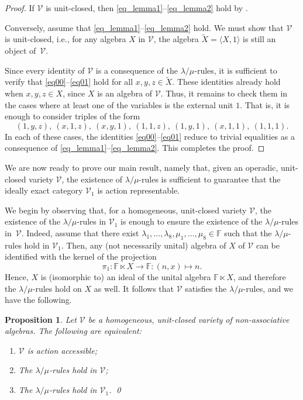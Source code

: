 \documentclass[reqno,a4paper]{amsart}
\theoremstyle{plain}
\newtheorem{proposition}[subsection]{Proposition}
\theoremstyle{definition}
\theoremstyle{remark}
\numberwithin{equation}{section}
\newenvironment{tfae}
{\renewcommand{\labelenumi}{(\roman{enumi})}
\begin{enumerate}}
{\end{enumerate}}
\newcommand{\noproof}{\hfil\qed}
\newcommand{\F}{\mathbb{F}}
\newcommand{\V}{\mathcal{V}}
\begin{document}
\begin{proof}
If $\V$ is unit-closed, then \eqref{eq_lemma1}--\eqref{eq_lemma2} hold by .

Conversely, assume that \eqref{eq_lemma1}--\eqref{eq_lemma2} hold. We must show that $\V$ is unit-closed, i.e., for any algebra $X$ in $\V$, the algebra $\widetilde X=\langle X,1 \rangle$ is still an object of~$\V$.

Since every identity of $\V$ is a consequence of the $\lambda/\mu$-rules, it is sufficient to verify that \eqref{eq00}--\eqref{eq01} hold for all $x,y,z \in \widetilde X$. These identities already hold when $x,y,z \in X$, since $X$ is an algebra of $\V$. Thus, it remains to check them in the cases where at least one of the variables is the external unit $1$. That is, it is enough to consider triples of the form
\[
(1,y,z),\ (x,1,z),\ (x,y,1),\ (1,1,z),\ (1,y,1),\ (x,1,1),\ (1,1,1).
\]
In each of these cases, the identities \eqref{eq00}--\eqref{eq01} reduce to trivial equalities as a consequence of \eqref{eq_lemma1}--\eqref{eq_lemma2}. This completes the proof.
\end{proof}

We are now ready to prove our main result, namely that, given an operadic, unit-closed variety $\V$, the existence of $\lambda/\mu$-rules is sufficient to guarantee that the ideally exact category $\V_1$ is action representable. 

We begin by observing that, for a homogeneous, unit-closed variety $\V$, the existence of the $\lambda/\mu$-rules in $\V_1$ is enough to ensure the existence of the $\lambda/\mu$-rules in~$\V$. Indeed, assume that there exist $\lambda_1,\ldots,\lambda_8,\mu_1,\ldots,\mu_8 \in \F$ such that the $\lambda/\mu$-rules hold in $\V_1$. Then, any (not necessarily unital) algebra of $X$ of $\V$ can be identified with the kernel of the projection
\[
\pi_1 \colon \F \ltimes X \to \F \colon (n,x) \mapsto n.
\]
Hence, $X$ is (isomorphic to) an ideal of the unital algebra $\F \ltimes X$, and therefore the $\lambda/\mu$-rules hold on $X$ as well. It follows that $\V$ satisfies the $\lambda/\mu$-rules, and we have the following.

\begin{proposition}
Let $\V$ be a homogeneous, unit-closed variety of non-associative algebras. The following are equivalent:
\begin{tfae}
\item $\V$ is action accessible;
\item The $\lambda/\mu$-rules hold in $\V$;
\item The $\lambda/\mu$-rules hold in $\V_1$. \noproof
\end{tfae}
\end{proposition}
\end{document}
